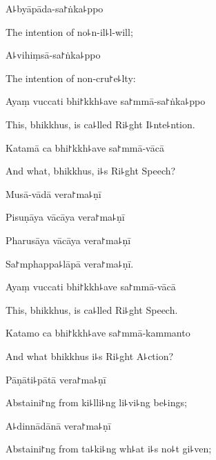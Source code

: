 A꜕byāpāda-sa꜓ṅka꜕ppo

\begin{english}
  The intention of no꜕n-il꜕l-will;
\end{english}

A꜕vihiṃsā-sa꜓ṅka꜕ppo

\begin{english}
  The intention of non-cru꜓e꜕lty:
\end{english}

Ayaṃ vuccati bhi꜓kkh꜕ave sa꜓mmā-sa꜓ṅka꜕ppo

\begin{english}
  This, bhikkhus, is ca꜕lled Ri꜕ght I꜕nte꜕ntion.
\end{english}

Katamā ca bhi꜓kkh꜕ave sa꜓mmā-vācā

\begin{english}
  And what, bhikkhus, i꜕s Ri꜕ght Speech?
\end{english}

Musā-vādā vera꜓ma꜕ṇī


Pisuṇāya vācāya vera꜓ma꜕ṇī


Pharusāya vācāya vera꜓ma꜕ṇī


Sa꜓mphappa꜕lāpā vera꜓ma꜕ṇī.


\ifaivedition
\clearpage
\fi

Ayaṃ vuccati bhi꜓kkh꜕ave sa꜓mmā-vācā

\begin{english}
  This, bhikkhus, is ca꜕lled Ri꜕ght Speech.
\end{english}

Katamo ca bhi꜓kkh꜕ave sa꜓mmā-kammanto

\begin{english}
  And what bhikkhus i꜕s Ri꜕ght A꜕ction?
\end{english}

Pāṇāti꜕pātā vera꜓ma꜕ṇī

\begin{english}
  Abstaini꜓ng from ki꜕lli꜕ng li꜕vi꜕ng be꜕ings;
\end{english}

A꜕dinnādānā vera꜓ma꜕ṇī

\begin{english}
  Abstaini꜓ng from ta꜕ki꜕ng wh꜕at i꜕s no꜕t gi꜕ven;
\end{english}

